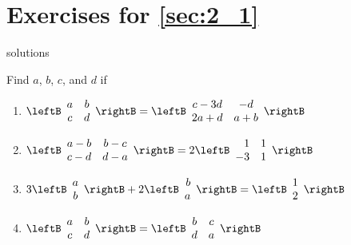 \section*{Exercises for \ref{sec:2_1}}

\begin{Filesave}{solutions}
\end{Filesave}

\begin{multicols}{2}
\begin{ex}
Find $a$, $b$, $c$, and $d$ if


\begin{enumerate}[label={\alph*.}]
\item 
$
\leftB \begin{array}{cc}
a & b \\
c & d
\end{array} \rightB = 
\leftB \begin{array}{cc}
c - 3d & -d \\
2a + d & a + b
\end{array} \rightB
$

\item 
$
\leftB \begin{array}{cc}
a - b & b - c \\
c - d & d - a
\end{array} \rightB = 2
\leftB \begin{array}{rr}
1 & 1 \\
-3 & 1
\end{array} \rightB
$

\item 
$
3 \leftB \begin{array}{c}
a \\
b
\end{array} \rightB + 2
\leftB \begin{array}{rr}
b \\
a
\end{array} \rightB =
\leftB \begin{array}{rr}
1 \\
2
\end{array} \rightB
$

\item 
$
\leftB \begin{array}{cc}
a & b \\
c & d
\end{array} \rightB = 
\leftB \begin{array}{cc}
b & c \\
d & a
\end{array} \rightB
$


\end{enumerate}
\end{ex}
\end{multicols}
